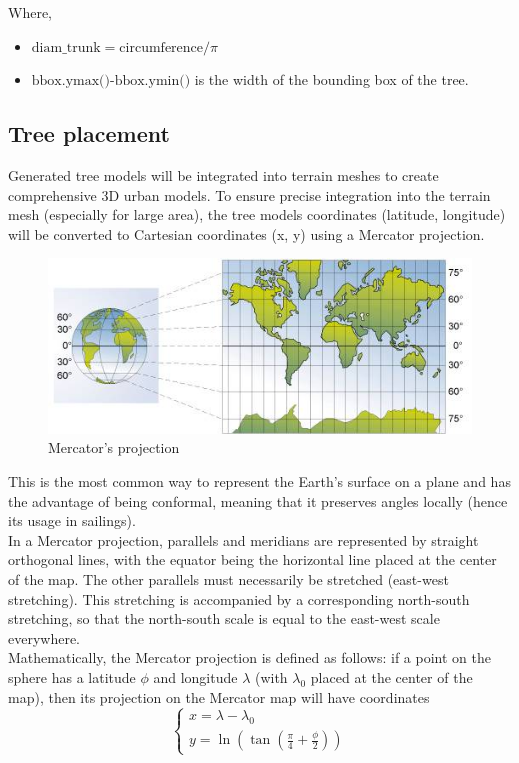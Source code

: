 \documentclass[12pt]{article}
\begin{document}
Where,
\begin{itemize}
    \item $\text{diam\_trunk} = \text{circumference} / \pi$
    \item $\text{bbox.ymax()-bbox.ymin()}$
is the width of the bounding box of the tree.
\end{itemize}

\subsection{Tree placement}

Generated tree models will be integrated into terrain meshes to create comprehensive
3D urban models. To ensure precise integration into the terrain mesh (especially for large area), the tree models coordinates
(latitude, longitude) will be converted to Cartesian coordinates (x, y) using
a Mercator projection\cite{mercator-proj}.

\begin{figure}[H]
    \centering
    \includegraphics[width=1\textwidth]{images/mercator.jpg}
    \caption{Mercator's projection\cite{img:mercator}}
\end{figure}

This is the most common way to represent the Earth's surface on a plane and has
the advantage of being conformal, meaning that it preserves angles locally (hence
 its usage in sailings). \\
 In a Mercator projection, parallels and meridians are represented by straight
 orthogonal lines, with the equator being the horizontal line placed at the center
  of the map. The other parallels must necessarily be stretched (east-west
  stretching). This stretching is accompanied by a corresponding north-south
  stretching, so that the north-south scale is equal to the east-west scale
  everywhere. \\
  Mathematically, the Mercator projection is defined as follows: if a point on
  the sphere has a latitude $\phi$ and longitude $\lambda$ (with $\lambda_{0}$
  placed at the center of the map), then its projection on the Mercator map will
  have coordinates
  \begin{equation}
    \left\{
    \begin{array}{l}
        x =  \lambda - \lambda_{0} \\
        y =  \ln(\tan(\frac{\pi}{4} + \frac{\phi}{2}))
    \end{array}
    \right.
\end{equation}
\end{document}
